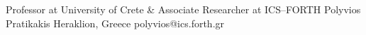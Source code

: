 


\begin{cventries}

  \cventry
    {Professor at University of Crete \& Associate Researcher at ICS--FORTH} %
    {Polyvios Pratikakis} %
    {Heraklion, Greece} %
    {} %
    {
        polyvios@ics.forth.gr
    }

\end{cventries}

